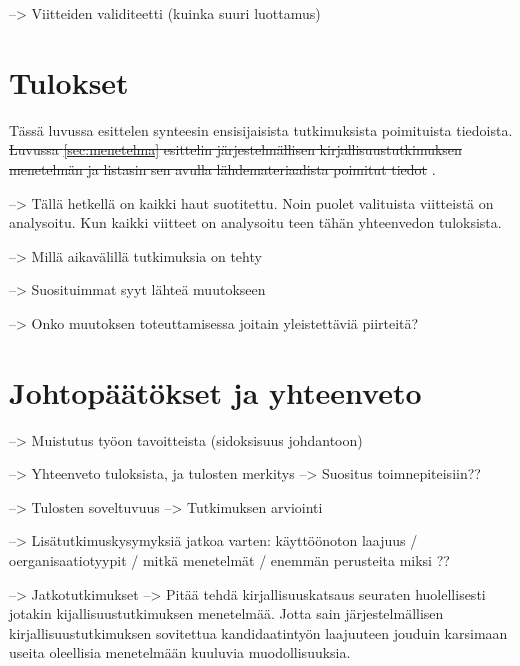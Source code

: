 --> Viitteiden validiteetti (kuinka suuri luottamus)


\section{Tulokset}
\label{sec:tulokset}

Tässä luvussa esittelen synteesin ensisijaisista tutkimuksista poimituista
tiedoista. \sout{Luvussa \ref{sec:menetelma} esittelin järjestelmällisen
kirjallisuustutkimuksen menetelmän ja listasin sen avulla lähdemateriaalista
poimitut tiedot} \citep{Kitchenham2007}.

--> Tällä hetkellä on kaikki haut suotitettu. Noin puolet valituista viitteistä
on analysoitu. Kun kaikki viitteet on analysoitu teen tähän yhteenvedon
tuloksista.

--> Millä aikavälillä tutkimuksia on tehty

--> Suosituimmat syyt lähteä muutokseen

--> Onko muutoksen toteuttamisessa joitain yleistettäviä piirteitä?


\section{Johtopäätökset ja yhteenveto}
\label{sec:johtopaatokset}

--> Muistutus työon tavoitteista (sidoksisuus johdantoon)

--> Yhteenveto tuloksista, ja tulosten merkitys
--> Suositus toimnepiteisiin??

--> Tulosten soveltuvuus
--> Tutkimuksen arviointi

--> Lisätutkimuskysymyksiä jatkoa varten: käyttöönoton laajuus /
oerganisaatiotyypit / mitkä menetelmät / enemmän perusteita miksi ?? 

--> Jatkotutkimukset
--> Pitää tehdä kirjallisuuskatsaus seuraten huolellisesti jotakin
kijallisuustutkimuksen menetelmää. Jotta sain järjestelmällisen
kirjallisuustutkimuksen sovitettua kandidaatintyön laajuuteen jouduin
karsimaan useita oleellisia menetelmään kuuluvia muodollisuuksia.


